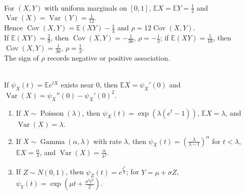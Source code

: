\begin{example} \label{ex:covariance-correlation-bivariate-uniform-family} \\
For $(X,Y)$ with uniform marginals on $[0,1]$, $\mathbb{E}X=\mathbb{E}Y=\frac{1}{2}$ and $\operatorname{Var}(X)=\operatorname{Var}(Y)=\frac{1}{12}$.\\
Hence $\operatorname{Cov}(X,Y)=\mathbb{E}(XY)-\frac{1}{4}$ and $\rho=12\operatorname{Cov}(X,Y)$.\\
If $\mathbb{E}(XY)=\frac{2}{9}$, then $\operatorname{Cov}(X,Y)=-\frac{1}{36}$, $\rho=-\frac{1}{3}$; if $\mathbb{E}(XY)=\frac{5}{18}$, then $\operatorname{Cov}(X,Y)=\frac{1}{36}$, $\rho=\frac{1}{3}$.\\
The sign of $\rho$ records negative or positive association.
\end{example}

\begin{method} \label{meth:mgf-calculus-for-classical-laws} \\
If $\psi_X(t)=\mathbb{E}e^{tX}$ exists near $0$, then $\mathbb{E}X=\psi_X'(0)$ and $\operatorname{Var}(X)=\psi_X''(0)-\psi_X'(0)^2$.
\begin{enumerate}[label=(\roman*)]
\setlength{\itemsep}{0pt}
\item If $X\sim\operatorname{Poisson}(\lambda)$, then $\psi_X(t)=\exp(\lambda(e^t-1))$, $\mathbb{E}X=\lambda$, and $\operatorname{Var}(X)=\lambda$.
\item If $X\sim\operatorname{Gamma}(\alpha,\lambda)$ with rate $\lambda$, then $\psi_X(t)=(\frac{\lambda}{\lambda-t})^\alpha$ for $t<\lambda$, $\mathbb{E}X=\frac{\alpha}{\lambda}$, and $\operatorname{Var}(X)=\frac{\alpha}{\lambda^2}$.
\item If $Z\sim N(0,1)$, then $\psi_Z(t)=e^{\frac{t^2}{2}}$; for $Y=\mu+\sigma Z$, $\psi_Y(t)=\exp(\mu t+\frac{\sigma^2t^2}{2})$.
\end{enumerate}
\end{method}

